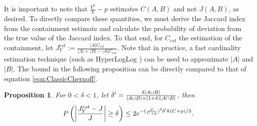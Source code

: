 \documentclass[11pt,reqno]{amsart}
\newtheorem{proposition}[theorem]{Proposition}
\theoremstyle{remark}
\numberwithin{equation}{section}
\newcommand{\containX}{Y}
\begin{document}
It is important to note that $\frac{\containX^k}{k}-p$ estimates $C(A,B)$ and not $J(A,B)$, as desired. To directly compare these quantities, we must derive the Jaccard index from the containment estimate and calculate the probability of deviation from the true value of the Jaccard index. To that end, for $C_{est}$ the estimation of the containment, let $J_\containX^{est}:=\frac{|A|C_{est}}{|A|+|B|-|A|C_{est}}$. Note that in practice, a fast cardinality estimation technique (such as HyperLogLog \cite{flajolet2007hyperloglog}) can be used to approximate $|A|$ and $|B|$. The bound in the following proposition can be directly compared to that of equation \eqref{eqn:ClassicChernoff}.
\begin{proposition}
\label{prop:bounds}
For $0<\delta<1$, let $\delta\rq{}= \frac{\delta |A \cup B|}{|A\cup B|+(1+\delta)|A \cap B|}$, then
$$
P\left(\left|\frac{J_\containX^{est}-J}{J}\right|\geq \delta\right) \leq 2e^{-(\frac{C}{C+p})^2\delta\rq{}k(C+p)/3}.
$$
\end{proposition}
\end{document}
